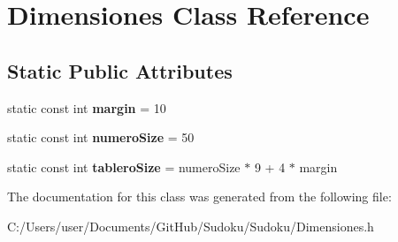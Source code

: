 \hypertarget{class_dimensiones}{\section{Dimensiones Class Reference}
\label{class_dimensiones}
}
\subsection*{Static Public Attributes}
\begin{DoxyCompactItemize}
\item 
\hypertarget{class_dimensiones_a2fb9391d1230b6cc7a2a4008e74bcddc}{static const int {\bfseries margin} = 10}\label{class_dimensiones_a2fb9391d1230b6cc7a2a4008e74bcddc}

\item 
\hypertarget{class_dimensiones_a961ddc06835eac206208ca5069d935b7}{static const int {\bfseries numero\-Size} = 50}\label{class_dimensiones_a961ddc06835eac206208ca5069d935b7}

\item 
\hypertarget{class_dimensiones_ade4db223d06ae4688d1f39835bdb4654}{static const int {\bfseries tablero\-Size} = numero\-Size $\ast$ 9 + 4 $\ast$ margin}\label{class_dimensiones_ade4db223d06ae4688d1f39835bdb4654}

\end{DoxyCompactItemize}


The documentation for this class was generated from the following file\-:\begin{DoxyCompactItemize}
\item 
C\-:/\-Users/user/\-Documents/\-Git\-Hub/\-Sudoku/\-Sudoku/Dimensiones.\-h\end{DoxyCompactItemize}
